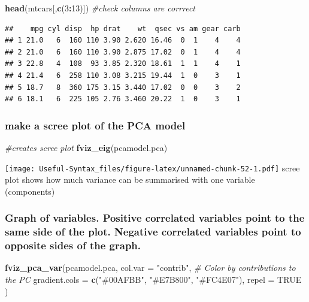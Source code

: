 \documentclass[
]{article}
\newenvironment{Shaded}{\begin{snugshade}}{\end{snugshade}}
\newcommand{\AttributeTok}[1]{\textcolor[rgb]{0.13,0.29,0.53}{#1}}
\newcommand{\CommentTok}[1]{\textcolor[rgb]{0.56,0.35,0.01}{\textit{#1}}}
\newcommand{\ConstantTok}[1]{\textcolor[rgb]{0.56,0.35,0.01}{#1}}
\newcommand{\DecValTok}[1]{\textcolor[rgb]{0.00,0.00,0.81}{#1}}
\newcommand{\FunctionTok}[1]{\textcolor[rgb]{0.13,0.29,0.53}{\textbf{#1}}}
\newcommand{\NormalTok}[1]{#1}
\newcommand{\SpecialCharTok}[1]{\textcolor[rgb]{0.81,0.36,0.00}{\textbf{#1}}}
\newcommand{\StringTok}[1]{\textcolor[rgb]{0.31,0.60,0.02}{#1}}
\begin{document}
\begin{Shaded}
\begin{Highlighting}[]
\FunctionTok{head}\NormalTok{(mtcars[,}\FunctionTok{c}\NormalTok{(}\DecValTok{3}\SpecialCharTok{:}\DecValTok{13}\NormalTok{)]) }\CommentTok{\#check columns are corrrect}
\end{Highlighting}
\end{Shaded}

\begin{verbatim}
##    mpg cyl disp  hp drat    wt  qsec vs am gear carb
## 1 21.0   6  160 110 3.90 2.620 16.46  0  1    4    4
## 2 21.0   6  160 110 3.90 2.875 17.02  0  1    4    4
## 3 22.8   4  108  93 3.85 2.320 18.61  1  1    4    1
## 4 21.4   6  258 110 3.08 3.215 19.44  1  0    3    1
## 5 18.7   8  360 175 3.15 3.440 17.02  0  0    3    2
## 6 18.1   6  225 105 2.76 3.460 20.22  1  0    3    1
\end{verbatim}

\hypertarget{make-a-scree-plot-of-the-pca-model}{%
\subsubsection{make a scree plot of the PCA model}\label{make-a-scree-plot-of-the-pca-model}}

\begin{Shaded}
\begin{Highlighting}[]
\CommentTok{\#creates scree plot}
\FunctionTok{fviz\_eig}\NormalTok{(pcamodel.pca)}
\end{Highlighting}
\end{Shaded}

\texttt{[image: Useful-Syntax\_files/figure-latex/unnamed-chunk-52-1.pdf]}
scree plot shows how much variance can be summarised with one variable (components)

\hypertarget{graph-of-variables.-positive-correlated-variables-point-to-the-same-side-of-the-plot.-negative-correlated-variables-point-to-opposite-sides-of-the-graph.}{%
\subsubsection{Graph of variables. Positive correlated variables point to the same side of the plot. Negative correlated variables point to opposite sides of the graph.}\label{graph-of-variables.-positive-correlated-variables-point-to-the-same-side-of-the-plot.-negative-correlated-variables-point-to-opposite-sides-of-the-graph.}}

\begin{Shaded}
\begin{Highlighting}[]
\FunctionTok{fviz\_pca\_var}\NormalTok{(pcamodel.pca,}
             \AttributeTok{col.var =} \StringTok{"contrib"}\NormalTok{, }\CommentTok{\# Color by contributions to the PC}
             \AttributeTok{gradient.cols =} \FunctionTok{c}\NormalTok{(}\StringTok{"\#00AFBB"}\NormalTok{, }\StringTok{"\#E7B800"}\NormalTok{, }\StringTok{"\#FC4E07"}\NormalTok{),}
             \AttributeTok{repel =} \ConstantTok{TRUE}\NormalTok{   )}
\end{Highlighting}
\end{Shaded}
\end{document}
